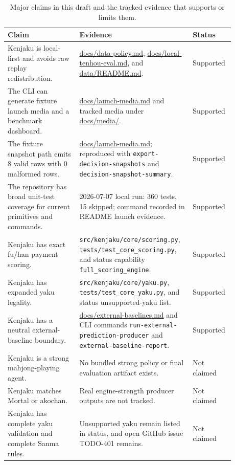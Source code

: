 \documentclass[11pt]{article}
\begin{document}
\begin{table}[h]
\centering
\caption{Major claims in this draft and the tracked evidence that supports or limits them.}
\label{tab:claim-evidence}
\begin{tabular}{L{0.30\linewidth}L{0.43\linewidth}L{0.15\linewidth}}
\toprule
Claim & Evidence & Status \\
\midrule
Kenjaku is local-first and avoids raw replay redistribution. & \href{../data-policy.md}{docs/data-policy.md}, \href{../local-tenhou-eval.md}{docs/local-tenhou-eval.md}, and \href{../../data/README.md}{data/README.md}. & Supported \\
The CLI can generate fixture launch media and a benchmark dashboard. & \href{../launch-media.md}{docs/launch-media.md} and tracked media under \href{../media/}{docs/media/}. & Supported \\
The fixture snapshot path emits 8 valid rows with 0 malformed rows. & \href{../launch-media.md}{docs/launch-media.md}; reproduced with \texttt{export-decision-snapshots} and \texttt{decision-snapshot-summary}. & Supported \\
The repository has broad unit-test coverage for current primitives and commands. & 2026-07-07 local run: 360 tests, 15 skipped; command recorded in README launch evidence. & Supported \\
Kenjaku has exact fu/han payment scoring. & \texttt{src/kenjaku/core/scoring.py}, \texttt{tests/test\_core\_scoring.py}, and status capability \texttt{full\_scoring\_engine}. & Supported \\
Kenjaku has expanded yaku legality. & \texttt{src/kenjaku/core/yaku.py}, \texttt{tests/test\_core\_yaku.py}, and status unsupported-yaku list. & Supported \\
Kenjaku has a neutral external-baseline boundary. & \href{../external-baselines.md}{docs/external-baselines.md} and CLI commands \texttt{run-external-prediction-producer} and \texttt{external-baseline-report}. & Supported \\
Kenjaku is a strong mahjong-playing agent. & No bundled strong policy or final evaluation artifact exists. & Not claimed \\
Kenjaku matches Mortal or akochan. & Real engine-strength producer outputs are not tracked. & Not claimed \\
Kenjaku has complete yaku validation and complete Sanma rules. & Unsupported yaku remain listed in status, and open GitHub issue TODO-401 remains. & Not claimed \\
\bottomrule
\end{tabular}
\end{table}
\end{document}
